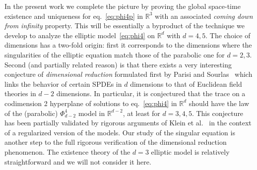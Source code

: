 \documentclass[a4paper,11pt]{article}
\numberwithin{equation}{section}
\newcommand{\R}{\mathbb{R}}
\newcommand{\8}{\infty}
\begin{document}
In the present work we complete the picture by proving the global space-time existence and uniqueness for eq.~\eqref{eq:phi4p} in $\R^3$ with an associated \emph{coming down from infinity} property. This will be essentially a byproduct of the technique we develop to analyze the elliptic model~\eqref{eq:phi4} on $\R^d$ with $d=4,5$. The choice of dimensions has a two-fold origin: first it corresponds to the dimensions where the singularities of the elliptic equation match those of the parabolic one for $d=2,3$. Second (and partially related reason) is that there exists a very interesting conjecture of \emph{dimensional reduction} formulated first by Parisi and Sourlas~\cite{parisi_random_1979} which links the behavior of certain SPDEs in $d$ dimensions to that of Euclidean field theories in $d-2$ dimensions. In particular, it is conjectured that the trace on a codimension 2 hyperplane  of solutions to eq.~\eqref{eq:phi4} in $\R^d$ should have the law of the (parabolic) $\Phi^4_{d-2}$ model in $\R^{d-2}$, at least for $d=3,4,5$. This conjecture has been partially validated by rigorous arguments of Klein et al.~\cite{klein_supersymmetry_1983, klein_supersymmetry_1984} in the context of a regularized version of the models. Our study of the singular equation is another step to the full rigorous verification of the dimensional reduction phenomenon. The existence theory of the $d=3$ elliptic model is relatively straightforward and we will not consider it here.
\end{document}
